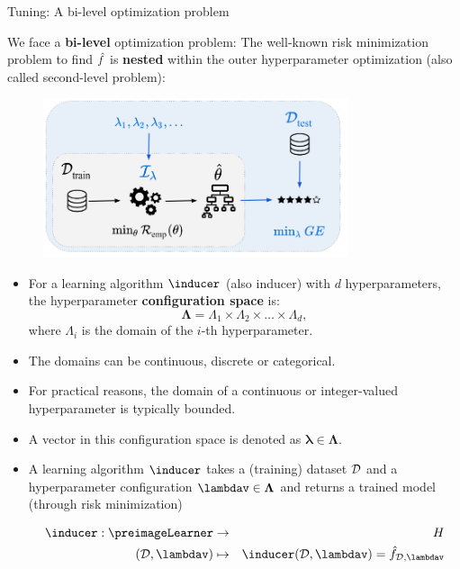 \documentclass[11pt,compress,t,notes=noshow, xcolor=table]{beamer}
\begin{document}
\begin{vbframe}{Tuning: A bi-level optimization problem} 

\vspace{0.2cm} 

We face a \textbf{bi-level} optimization problem: The well-known risk minimization problem to find $\hat{f}$ is \textbf{nested} within the outer hyperparameter optimization (also called second-level problem):

\begin{center}
\begin{figure}
\includegraphics[width=0.8\textwidth]{figure_man/riskmin_bilevel3.png}
\end{figure}
\end{center}

\framebreak
  \footnotesize
  \begin{itemize}
    \item For a learning algorithm $\inducer$ (also inducer) with $d$ hyperparameters, the hyperparameter \textbf{configuration space} is:
      $$\bm{\Lambda}=\Lambda_{1} \times \Lambda_{2} \times \ldots \times \Lambda_{d},$$
      where $\Lambda_{i}$ is the domain of the $i$-th hyperparameter.
    \item The domains can be continuous, discrete or categorical.
    \item For practical reasons, the domain of a continuous or integer-valued hyperparameter is typically bounded.
    \item A vector in this configuration space is denoted as $\bm{\lambda} \in \bm{\Lambda}$.
    \item A learning algorithm $\inducer$ takes a (training) dataset $\mathcal{D}$ and a hyperparameter configuration $\lambdav \in \bm{\Lambda}$ and returns a trained model (through risk minimization)

    \vspace*{-0.2cm}
  \begin{eqnarray*}
    \inducer: \preimageLearner &\to& \Hspace \\
    (\D, \lambdav) &\mapsto& \inducer(\D, \lambdav) = \hat f_{\D, \lambdav}
  \end{eqnarray*}
  \end{itemize}


\end{vbframe}
\end{document}

